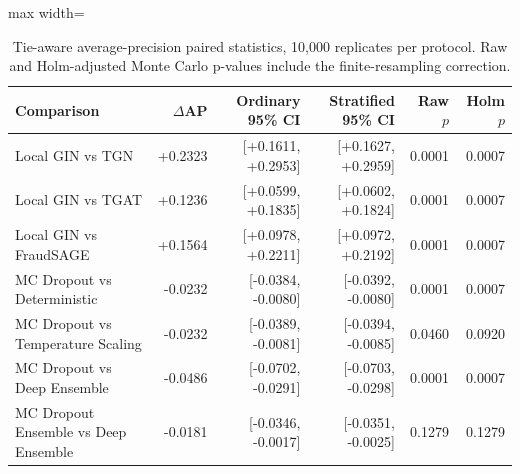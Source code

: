 \begin{table}[H]
\caption{Tie-aware average-precision paired statistics, 10,000 replicates per protocol. Raw and Holm-adjusted Monte Carlo p-values include the finite-resampling correction.}\label{tab:stats}
\centering\small
\begin{adjustbox}{max width=\linewidth}
\begin{tabular}{lrrrrr}
\toprule
Comparison & $\Delta$AP & Ordinary 95\% CI & Stratified 95\% CI & Raw $p$ & Holm $p$ \\
\midrule
Local GIN vs TGN & +0.2323 & [+0.1611, +0.2953] & [+0.1627, +0.2959] & 0.0001 & 0.0007 \\
Local GIN vs TGAT & +0.1236 & [+0.0599, +0.1835] & [+0.0602, +0.1824] & 0.0001 & 0.0007 \\
Local GIN vs FraudSAGE & +0.1564 & [+0.0978, +0.2211] & [+0.0972, +0.2192] & 0.0001 & 0.0007 \\
MC Dropout vs Deterministic & -0.0232 & [-0.0384, -0.0080] & [-0.0392, -0.0080] & 0.0001 & 0.0007 \\
MC Dropout vs Temperature Scaling & -0.0232 & [-0.0389, -0.0081] & [-0.0394, -0.0085] & 0.0460 & 0.0920 \\
MC Dropout vs Deep Ensemble & -0.0486 & [-0.0702, -0.0291] & [-0.0703, -0.0298] & 0.0001 & 0.0007 \\
MC Dropout Ensemble vs Deep Ensemble & -0.0181 & [-0.0346, -0.0017] & [-0.0351, -0.0025] & 0.1279 & 0.1279 \\
\bottomrule
\end{tabular}
\end{adjustbox}
\end{table}
